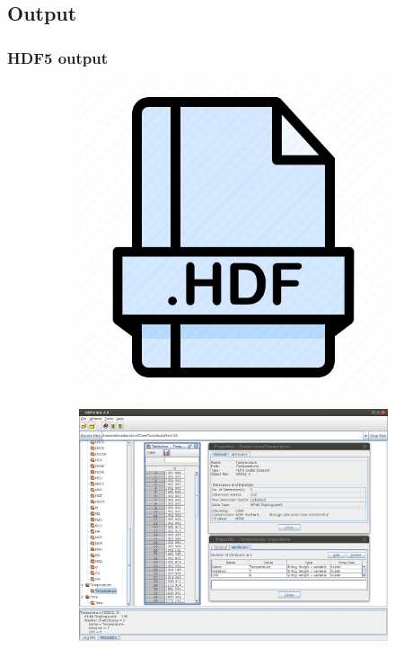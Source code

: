 \documentclass{beamer}
\begin{document}
\subsection{Output}
\begin{frame}
\frametitle{HDF5 output}
\begin{figure}
\centering
\begin{subfigure}{.12\textwidth}
  \centering
  \includegraphics[width=\linewidth]{figures/hdf.png}
\end{subfigure}
\begin{subfigure}{.84\textwidth}
  \centering
  \includegraphics[width=\linewidth]{figures/output.png}
\end{subfigure}
\end{figure}
\end{frame}
\end{document}
